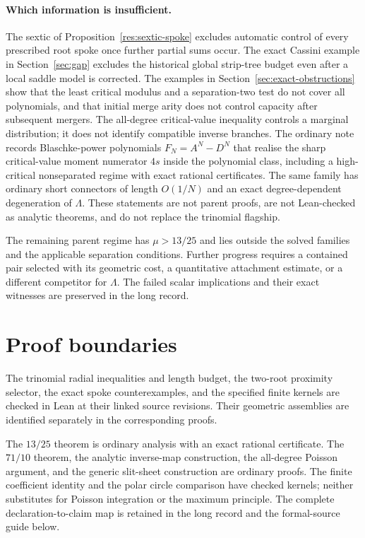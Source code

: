 \documentclass[11pt]{article}
\begin{document}
\paragraph{Which information is insufficient.}
The sextic of Proposition~\ref{res:sextic-spoke} excludes automatic control of
every prescribed root spoke once further partial sums occur.  The exact
Cassini example in Section~\ref{sec:gap} excludes the historical global
strip-tree budget even after a local saddle model is corrected.  The examples
in Section~\ref{sec:exact-obstructions} show that the least critical modulus
and a separation-two test do not cover all polynomials, and that initial merge
arity does not control capacity after subsequent mergers.  The all-degree
critical-value inequality controls a marginal distribution; it does not
identify compatible inverse branches.
The ordinary note
records Blaschke-power polynomials $F_N=A^N-D^N$ that realise the sharp
critical-value moment numerator $4s$ inside the polynomial class, including
a high-critical nonseparated regime with exact rational certificates.  The
same family has ordinary short connectors of length $O(1/N)$ and an exact
degree-dependent degeneration of $\Lambda$.  These statements are not
parent proofs, are not Lean-checked as analytic theorems, and do not
replace the trinomial flagship.

The remaining parent regime has $\mu>13/25$ and lies outside the solved
families and the applicable separation conditions.  Further progress requires
a contained pair selected with its geometric cost, a quantitative attachment
estimate, or a different competitor for $\Lambda$.  The failed scalar
implications and their exact witnesses are preserved in the long record.

\section{Proof boundaries}\label{sec:evidence-ledger}

The trinomial radial inequalities and length budget, the two-root proximity
selector, the exact spoke counterexamples, and the specified finite kernels
are checked in Lean at their linked source revisions.  Their geometric
assemblies are identified separately in the corresponding proofs.

The $13/25$ theorem is ordinary analysis with an exact rational certificate.
The $71/10$ theorem, the analytic inverse-map construction, the all-degree
Poisson argument, and the generic slit-sheet construction are ordinary
proofs.  The finite coefficient identity and the polar circle comparison
have checked kernels; neither substitutes for Poisson integration or the
maximum principle.  The complete declaration-to-claim map is retained in the
long record and the formal-source guide below.
\end{document}
